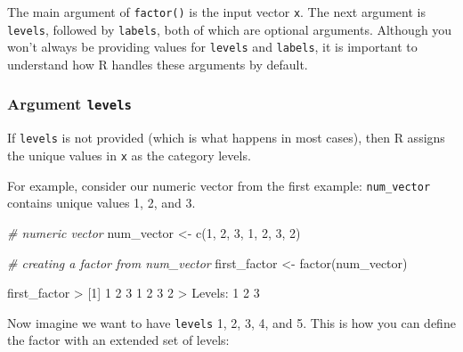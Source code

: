 \documentclass[
]{book}
\newenvironment{Shaded}{\begin{snugshade}}{\end{snugshade}}
\newcommand{\CommentTok}[1]{\textcolor[rgb]{0.56,0.35,0.01}{\textit{#1}}}
\newcommand{\DecValTok}[1]{\textcolor[rgb]{0.00,0.00,0.81}{#1}}
\newcommand{\FunctionTok}[1]{\textcolor[rgb]{0.00,0.00,0.00}{#1}}
\newcommand{\NormalTok}[1]{#1}
\newcommand{\OtherTok}[1]{\textcolor[rgb]{0.56,0.35,0.01}{#1}}
\newcommand{\SpecialCharTok}[1]{\textcolor[rgb]{0.00,0.00,0.00}{#1}}
\begin{document}
The main argument of \texttt{factor()} is the input vector \texttt{x}. The next argument is
\texttt{levels}, followed by \texttt{labels}, both of which are optional arguments. Although
you won't always be providing values for \texttt{levels} and \texttt{labels}, it is important
to understand how R handles these arguments by default.

\hypertarget{argument-levels}{%
\subsubsection*{\texorpdfstring{Argument \texttt{levels}}{Argument levels}}\label{argument-levels}}

If \texttt{levels} is not provided (which is what happens in most cases), then R
assigns the unique values in \texttt{x} as the category levels.

For example, consider our numeric vector from the first example: \texttt{num\_vector}
contains unique values 1, 2, and 3.

\begin{Shaded}
\begin{Highlighting}[]
\CommentTok{\# numeric vector}
\NormalTok{num\_vector }\OtherTok{\textless{}{-}} \FunctionTok{c}\NormalTok{(}\DecValTok{1}\NormalTok{, }\DecValTok{2}\NormalTok{, }\DecValTok{3}\NormalTok{, }\DecValTok{1}\NormalTok{, }\DecValTok{2}\NormalTok{, }\DecValTok{3}\NormalTok{, }\DecValTok{2}\NormalTok{)}

\CommentTok{\# creating a factor from num\_vector}
\NormalTok{first\_factor }\OtherTok{\textless{}{-}} \FunctionTok{factor}\NormalTok{(num\_vector)}

\NormalTok{first\_factor}
\SpecialCharTok{\textgreater{}}\NormalTok{ [}\DecValTok{1}\NormalTok{] }\DecValTok{1} \DecValTok{2} \DecValTok{3} \DecValTok{1} \DecValTok{2} \DecValTok{3} \DecValTok{2}
\SpecialCharTok{\textgreater{}}\NormalTok{ Levels}\SpecialCharTok{:} \DecValTok{1} \DecValTok{2} \DecValTok{3}
\end{Highlighting}
\end{Shaded}

Now imagine we want to have \texttt{levels} 1, 2, 3, 4, and 5. This is how you can
define the factor with an extended set of levels:
\end{document}
